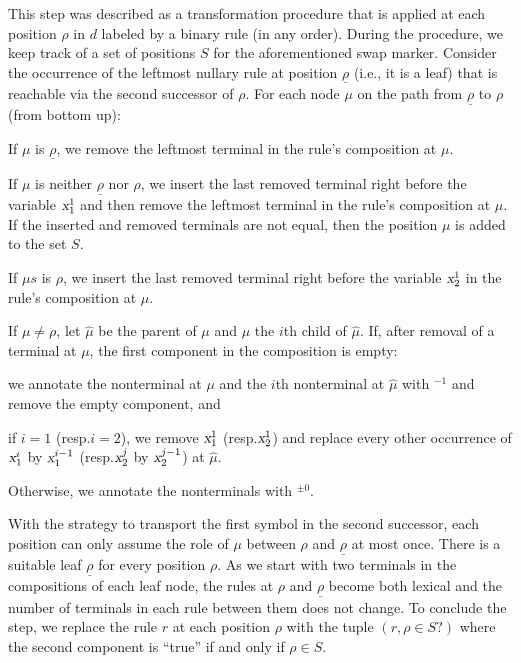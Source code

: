 \documentclass[../../document.tex]{subfiles}
\begin{document}
    This step was described as a transformation procedure that is applied at each position \(\rho\) in \(d\) labeled by a binary rule (in any order).
    During the procedure, we keep track of a set of positions \(S\) for the aforementioned swap marker.
    Consider the occurrence of the leftmost nullary rule at position \(\underline{\rho}\) (i.e., it is a leaf) that is reachable via the second successor of \(\rho\).
    For each node \(\mu\) on the path from \(\underline{\rho}\) to \(\rho\) (from bottom up):
    \begin{compactitem}
        \item If \(\mu\) is \(\underline{\rho}\), we remove the leftmost terminal in the rule's composition at \(\mu\).
        \item
            If \(\mu\) is neither \(\underline{\rho}\) nor \(\rho\), we insert the last removed terminal right before the variable \(\textsl{x}^1_1\) and then remove the leftmost terminal in the rule's composition at \(\mu\).
            If the inserted and removed terminals are not equal, then the position \(\mu\) is added to the set \(S\).
        \item If \(\mu s\) is \(\rho\), we insert the last removed terminal right before the variable \(\textsl{x}^1_2\) in the rule's composition at \(\mu\).
    \end{compactitem}
    If \(\mu \neq \rho\), let \(\hat{\mu}\) be the parent of $\mu$ and $\mu$ the \(i\)th child of $\hat{\mu}$.
    If, after removal of a terminal at \(\mu\), the first component in the composition is empty:
    \begin{compactitem}
        \item we annotate the  nonterminal at \(\mu\) and the \(i\)th  nonterminal at \(\hat{\mu}\) with $^{-1}$ and remove the empty component, and
        \item if \(i = 1\) (resp.\@ \(i = 2\)), we remove \(\textsl{x}^1_1\) (resp.\@ \(\textsl{x}_2^1\)) and replace every other occurrence of \(\textsl{x}_1^i\) by \(\textsl{x}_1^{i-1}\) (resp.\@ \(\textsl{x}_2^j\) by \(\textsl{x}_2^{j-1}\)) at $\hat{\mu}$.
    \end{compactitem}
    Otherwise, we annotate the nonterminals with \(^{\pm 0}\).

    With the strategy to transport the first symbol in the second successor, each position can only assume the role of \(\mu\) between \(\rho\) and \(\underline{\rho}\) at most once. There is a suitable leaf $\underline{\rho}$ for every position $\rho$.
    As we start with two terminals in the compositions of each leaf node, the rules at \(\rho\) and \(\underline{\rho}\) become both lexical and the number of terminals in each rule between them does not change.
    To conclude the step, we replace the rule \(r\) at each position \(\rho\) with the tuple \((r, \rho \in S?)\) where the second component is ``true'' if and only if \(\rho \in S\).
\end{document}
